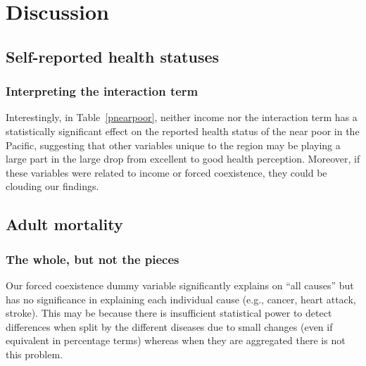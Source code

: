 \documentclass[12pt]{article}
\begin{document}
\section{Discussion}
\subsection{Self-reported health statuses}
\subsubsection{Interpreting the interaction term}

Interestingly, in Table~\ref{pnearpoor}, neither income nor the interaction term has a statistically significant effect on the reported health status of the near poor in the Pacific, suggesting that other variables unique to the region may be playing a large part in the large drop from excellent to good health perception.  Moreover, if these variables were related to income or forced coexistence, they could be clouding our findings.


\subsection{Adult mortality}
\subsubsection{The whole, but not the pieces}
Our forced coexistence dummy variable significantly explains on ``all causes'' but has no significance in explaining each individual cause (e.g., cancer, heart attack, stroke). This may be because there is insufficient statistical power to detect differences when split by the different diseases due to small changes (even if equivalent in percentage terms) whereas when they are aggregated there is not this problem. 
\end{document}
